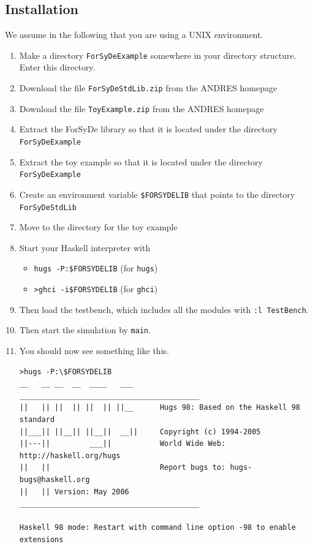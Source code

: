 \subsection{Installation}
\label{sec:Installation}

We assume in the following that you are using a UNIX environment.

\begin{enumerate} 
\item Make a directory \texttt{ForSyDeExample} somewhere in your directory structure. Enter this directory.
\item Download the file \texttt{ForSyDeStdLib.zip} from the ANDRES homepage
\item Download the file \texttt{ToyExample.zip} from the ANDRES homepage
\item Extract the ForSyDe library so that it is located under the directory \texttt{ForSyDeExample}
\item Extract the toy example so that it is located under the directory \texttt{ForSyDeExample}
\item Create an environment variable \texttt{\$FORSYDELIB} that points to the directory \texttt{ForSyDeStdLib}
\item Move to the directory for the toy example
\item Start your Haskell interpreter with
  \begin{itemize}
  \item \texttt{hugs -P:\$FORSYDELIB} (for \texttt{hugs})
  \item \texttt{>ghci -i\$FORSYDELIB} (for \texttt{ghci})
\end{itemize}
\item Then load the testbench, which includes all the modules with \texttt{:l TestBench}. 
\item Then start the simulation by \texttt{main}.
\item You should now see something like this.
\begin{verbatim}
>hugs -P:\$FORSYDELIB
__   __ __  __  ____   ___      _________________________________________
||   || ||  || ||  || ||__      Hugs 98: Based on the Haskell 98 standard
||___|| ||__|| ||__||  __||     Copyright (c) 1994-2005
||---||         ___||           World Wide Web: http://haskell.org/hugs
||   ||                         Report bugs to: hugs-bugs@haskell.org
||   || Version: May 2006       _________________________________________

Haskell 98 mode: Restart with command line option -98 to enable extensions


\end{verbatim}
\end{enumerate}
